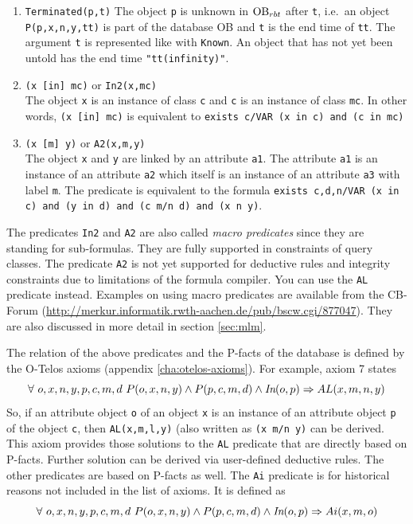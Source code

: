 \begin{enumerate}
It is regarded as an instance of the class {\tt TransactionTime}.
\item {\tt Terminated(p,t)}
The object {\tt p} is unknown in $\hbox{\rm OB}_{rbt}$ after {\tt t}, i.e.\ an object {\tt P(p,x,n,y,tt)} is
part of the database OB and {\tt t} is the end time of {\tt tt}. The argument
{\tt t} is represented like with {\tt Known}.
An object that has not yet been untold has the end time \verb+"tt(infinity)"+.
\item {\tt (x [in] mc)} or {\tt In2(x,mc)}\\
The object {\tt x} is an instance of class {\tt c} and {\tt c} is an instance of class {\tt mc}.
In other words, {\tt (x [in] mc)} is equivalent to 
{\tt exists c/VAR (x in c) and (c in mc)}
\item {\tt (x [m] y)} or {\tt A2(x,m,y)}\\
The object {\tt x} and {\tt y} are linked by an attribute {\tt a1}. 
The attribute {\tt a1} is an instance of an attribute {\tt a2}
which itself is an instance of an attribute {\tt a3} with label {\tt m}.
The predicate is equivalent to the formula
{\tt exists c,d,n/VAR (x in c) and (y in d) and (c m/n d) and (x n y)}.
\end{enumerate}

The predicates {\tt In2} and {\tt A2} are also called {\em macro predicates} since they are standing
for sub-formulas. They are fully supported in constraints of query classes.
The predicate {\tt A2} is not yet supported for deductive rules and integrity constraints
due to limitations of the formula compiler. You can use the {\tt AL} predicate instead.
Examples on using macro predicates are available from the CB-Forum
(\url{http://merkur.informatik.rwth-aachen.de/pub/bscw.cgi/877047}). They are
also discussed in more detail in section \ref{sec:mlm}.


The relation of the above predicates and the P-facts of the database is defined by the O-Telos
axioms (appendix \ref{cha:otelos-axioms}). For example, axiom 7 states
$$
\forall ~o,x,n,y,p,c,m,d ~P(o,x,n,y) \land P(p,c,m,d) \land \hbox{\it In}(o,p)
        \Rightarrow AL(x,m,n,y)
$$
So, if an attribute object {\tt o} of an object {\tt x} is an instance
of an attribute object {\tt p} of the object {\tt c}, then {\tt AL(x,m,l,y)} (also
written as {\tt (x m/n y)} can be derived. This axiom provides those solutions to
the {\tt AL} predicate that are directly based on P-facts. Further solution can be derived
via user-defined deductive rules. The other predicates are based on P-facts as well.
The {\tt Ai} predicate is for historical reasons not included in the list of axioms.
It is defined as
$$
\forall ~o,x,n,y,p,c,m,d ~P(o,x,n,y) \land P(p,c,m,d) \land \hbox{\it In}(o,p)
        \Rightarrow Ai(x,m,o)
$$

